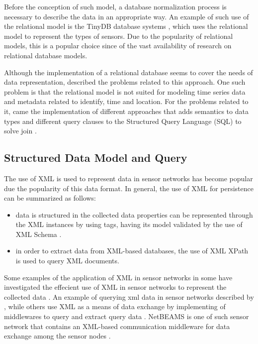 Before the conception of such model, a database normalization process is
necessary to describe the data in an appropriate way. An example of such use
of the relational model is the TinyDB database systems \cite{sn-db-tinydb},
which uses the relational model to represent the types of sensors. Due to the
popularity of relational models, this is a popular choice since of the vast
availability of research on relational database models.

Although the implementation of a relational database seems to cover the needs
of data representation, \cite{sn-data-model-survey} described the problems
related to this approach. One such problem is that the relational model is not
suited for modeling time series data and metadata related to identify, time and
location. For the problems related to it, came the implementation of different
approaches that adds semantics to data types and different query clauses to the
Structured Query Language (SQL) to solve join \cite{sn-db-newop}.

\subsection{Structured Data Model and Query}

The use of XML is used to represent data in sensor networks has become popular
due the popularity of this data format. In general, the use of XML for
persistence can be summarized as follows:

\begin{itemize}
  \item data is structured in the collected data properties can be represented through the
XML \cite{xml} instances by using tags, having its model validated by the use
of XML Schema \cite{xml-schema}.
  \item in order to extract data from XML-based databases, the use of XML XPath
  is used to query XML documents.
\end{itemize}

Some examples of the application of XML in sensor networks in 
\cite{sn-xml-usage02} some have investigated the effecient use of XML in
sensor networks to represent the collected data \cite{sn-xml-usage01}. An
example of querying xml data in sensor networks described by
\cite{sn-xml-query-engines}, while others use XML as a means of data exchange
by implementing of middlewares to query and extract query data
\cite{sn-xml-middleware}. NetBEAMS is one of such sensor network that contains
an XML-based communication middleware for data exchange among the sensor nodes
\cite{netbeams2009}.

